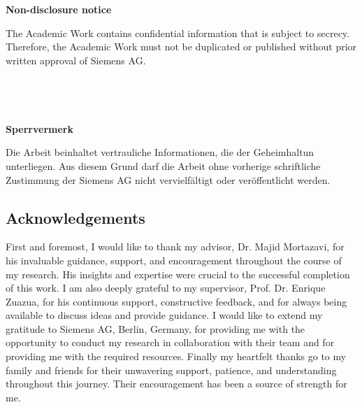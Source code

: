 \documentclass[12pt,oneside,reqno,a4paper,twoside]{article}
\begin{document}
\newpage 

\textbf{Non-disclosure notice}


The Academic Work contains confidential information that is subject to secrecy. Therefore, the Academic Work must not be duplicated or published without prior written approval of Siemens AG.\\\\\\\\\\


\textbf{Sperrvermerk}


Die Arbeit beinhaltet vertrauliche Informationen, die der Geheimhaltun unterliegen. Aus diesem Grund darf die Arbeit ohne vorherige schriftliche Zustimmung der Siemens AG nicht vervielfältigt oder veröffentlicht werden.

\newpage
\begin{center}
    \section*{Acknowledgements}
\end{center}
\sloppy
First and foremost, I would like to thank my advisor, Dr. Majid Mortazavi, for his invaluable guidance, support, and encouragement throughout the course of my research. His insights and expertise were crucial to the successful completion of this work.
I am also deeply grateful to my supervisor, Prof. Dr. Enrique Zuazua, for his continuous support, constructive feedback, and for always being available to discuss ideas and provide guidance.
I would like to extend my gratitude to Siemens AG, Berlin, Germany, for providing me with the opportunity to conduct my research in collaboration with their team and for providing me with the required resources.
Finally my heartfelt thanks go to my family and friends for their unwavering support, patience, and understanding throughout this journey. Their encouragement has been a source of strength for me.

\newpage %






\clearpage

\renewcommand{\cftsecleader}{\cftdotfill{\cftdotsep}}
\tableofcontents

\clearpage {}

\clearpage
\clearpage

\clearpage

\clearpage

\clearpage


\end{document}
